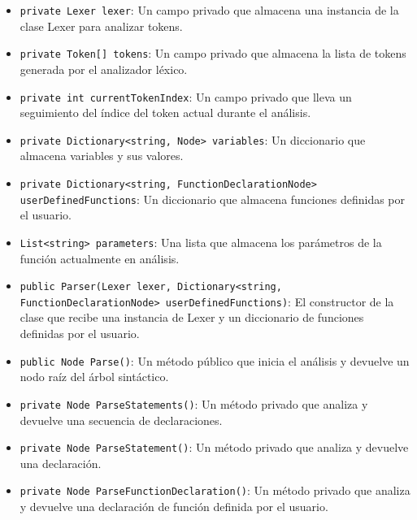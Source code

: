 \documentclass{article}
\begin{document}
\begin{itemize}[left=0pt]
    \item \textcolor{fieldcolor}{\lstinline{private Lexer lexer}}: Un campo privado que almacena una instancia de la clase \textcolor{classcolor}{Lexer} para analizar tokens.

    \item \textcolor{fieldcolor}{\lstinline{private Token[] tokens}}: Un campo privado que almacena la lista de tokens generada por el analizador léxico.

    \item \textcolor{fieldcolor}{\lstinline{private int currentTokenIndex}}: Un campo privado que lleva un seguimiento del índice del token actual durante el análisis.

    \item \textcolor{fieldcolor}{\lstinline{private Dictionary<string, Node> variables}}: Un diccionario que almacena variables y sus valores.

    \item \textcolor{fieldcolor}{\lstinline{private Dictionary<string, FunctionDeclarationNode> userDefinedFunctions}}: Un diccionario que almacena funciones definidas por el usuario.

    \item \textcolor{fieldcolor}{\lstinline{List<string> parameters}}: Una lista que almacena los parámetros de la función actualmente en análisis.

    \item \textcolor{constructorcolor}{\lstinline{public Parser(Lexer lexer, Dictionary<string, FunctionDeclarationNode> userDefinedFunctions)}}: El constructor de la clase que recibe una instancia de \textcolor{classcolor}{Lexer} y un diccionario de funciones definidas por el usuario.

    \item \textcolor{methodcolor}{\lstinline{public Node Parse()}}: Un método público que inicia el análisis y devuelve un nodo raíz del árbol sintáctico.

    \item \textcolor{methodcolor}{\lstinline{private Node ParseStatements()}}: Un método privado que analiza y devuelve una secuencia de declaraciones.

    \item \textcolor{methodcolor}{\lstinline{private Node ParseStatement()}}: Un método privado que analiza y devuelve una declaración.

    \item \textcolor{methodcolor}{\lstinline{private Node ParseFunctionDeclaration()}}: Un método privado que analiza y devuelve una declaración de función definida por el usuario.


\end{itemize}
\end{document}
